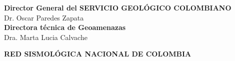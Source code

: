 %
\begin{center}
\vspace*{2cm}
{\bf \sffamily\textcolor{ocre}{Director General del SERVICIO GEOLÓGICO COLOMBIANO}}\\
Dr. Oscar Paredes Zapata\\ 
\vspace{0.5cm} 
{\bf \sffamily\textcolor{ocre}{Directora técnica de Geoamenazas}} \\
Dra. Marta Lucia Calvache\\ 
\vspace{0.5cm}

{\bf \sffamily\textcolor{ocre}{RED SISMOLÓGICA NACIONAL DE COLOMBIA}}\\
\vspace{0.4cm}
\end{center}

